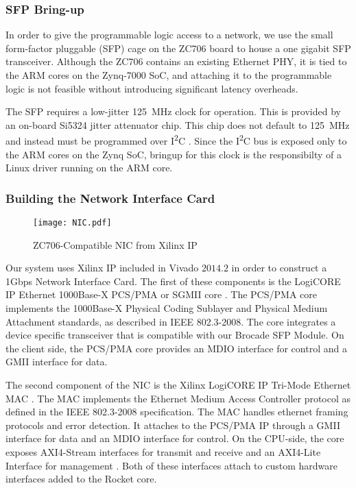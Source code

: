 \subsubsection {SFP Bring-up}
    In order to give the programmable logic access to a network, we use 
    the small form-factor pluggable (SFP) cage on the ZC706 board to house a 
    one gigabit SFP transceiver. Although the ZC706 contains an existing Ethernet
    PHY, it is tied to the ARM cores on the Zynq-7000 SoC, and attaching it to 
    the programmable logic is not feasible without introducing significant 
    latency overheads.

    The SFP requires a low-jitter \SI{125}{\mega\hertz} clock for operation. This is provided
    by an on-board Si5324 jitter attenuator chip. This chip does not default to 
    \SI{125}{\mega\hertz} and instead must be programmed over I\textsuperscript{2}C \cite{xapp1082}. Since the I\textsuperscript{2}C bus is exposed
    only to the ARM cores on the Zynq SoC, bringup for this clock is the 
    responsibilty of a Linux driver running on the ARM core.

\subsubsection{Building the Network Interface Card}

\begin{figure}[t]
\begin{center}
\texttt{[image: NIC.pdf]}
\caption{ZC706-Compatible NIC from Xilinx IP}
\label{fig:nic}
\end{center}
\end{figure}

    Our system uses Xilinx IP included in Vivado $2014.2$ in order to construct 
    a 1Gbps Network Interface Card. The first of these components is the LogiCORE
    IP Ethernet 1000Base-X PCS/PMA or SGMII core \cite{pcspma}. The PCS/PMA
    core implements the 1000Base-X Physical Coding Sublayer and Physical Medium
    Attachment standards, as described in IEEE 802.3-2008. The core integrates
    a device specific transceiver that is compatible with our Brocade SFP Module.
    On the client side, the PCS/PMA core provides an MDIO interface for control
    and a GMII interface for data.

    The second component of the NIC is the Xilinx LogiCORE IP Tri-Mode Ethernet 
    MAC \cite{trimac}. The MAC implements the Ethernet Medium Access Controller
    protocol as defined in the IEEE 802.3-2008 specification. The MAC handles
    ethernet framing protocols and error detection. It attaches to the PCS/PMA
    IP through a GMII interface for data and an MDIO interface for control.
    On the CPU-side, the core exposes AXI4-Stream interfaces for transmit and 
    receive and an AXI4-Lite Interface for management \cite{axi}. Both of these
    interfaces attach to custom hardware interfaces added to the Rocket core.


